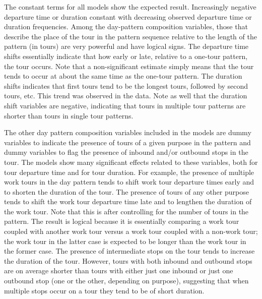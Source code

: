 The constant terms for all models show the expected result. Increasingly negative departure time or duration constant with decreasing observed departure time or duration frequencies. Among the day-pattern composition variables, those that describe the place of the tour in the pattern sequence relative to the length of the pattern (in tours) are very powerful and have logical signs. The departure time shifts essentially indicate that how early or late, relative to a one-tour pattern, the tour occurs. Note that a non-significant estimate simply means that the tour tends to occur at about the same time as the one-tour pattern. The duration shifts indicates that first tours tend to be the longest tours, followed by second tours, etc. This trend was observed in the data. Note as well that the duration shift variables are negative, indicating that tours in multiple tour patterns are shorter than tours in single tour patterns.

The other day pattern composition variables included in the models are dummy variables to indicate the presence of tours of a given purpose in the pattern and dummy variables to flag the presence of inbound and/or outbound stops in the tour. The models show many significant effects related to these variables, both for tour departure time and for tour duration. For example, the presence of multiple work tours in the day pattern tends to shift work tour departure times early and to shorten the duration of the tour. The presence of tours of any other purpose tends to shift the work tour departure time late and to lengthen the duration of the work tour. Note that this is after controlling for the number of tours in the pattern. The result is logical because it is essentially comparing a work tour coupled with another work tour versus a work tour coupled with a non-work tour; the work tour in the latter case is expected to be longer than the work tour in the former case. The presence of intermediate stops on the tour tends to increase the duration of the tour. However, tours with both inbound and outbound stops are on average shorter than tours with either just one inbound or just one outbound stop (one or the other, depending on purpose), suggesting that when multiple stops occur on a tour they tend to be of short duration.


